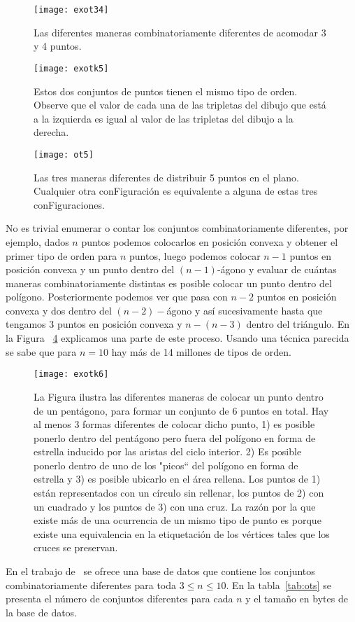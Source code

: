 \begin{figure}[htpb]
  \centering
  \texttt{[image: exot34]}
  \caption{Las diferentes maneras combinatoriamente diferentes
  de acomodar 3 y 4 puntos.}
  \label{fig:exotk34}
\end{figure}
\begin{figure}[htpb]
  \centering
  \texttt{[image: exotk5]}
  \caption{Estos dos conjuntos de puntos tienen el mismo tipo de orden.
  Observe que el valor de cada una de las tripletas del dibujo
  que está a la izquierda es igual al valor de las tripletas del
  dibujo a la derecha.}
  \label{fig:exotk5}
\end{figure}
\begin{figure}[htpb]
  \centering
  \texttt{[image: ot5]}
  \caption{Las tres maneras diferentes de distribuir 5 puntos en el plano.
  Cualquier otra conFiguración es equivalente a alguna de estas tres
  conFiguraciones.}
  \label{fig:ot5}
\end{figure}

No es trivial enumerar o contar los conjuntos combinatoriamente diferentes, por
ejemplo, dados $n$ puntos podemos colocarlos en posición convexa y obtener el
primer tipo de orden para $n$ puntos, luego podemos colocar $n-1$ puntos en
posición convexa y un punto dentro del $(n-1)$-ágono y evaluar de cuántas
maneras combinatoriamente distintas es posible colocar un punto dentro del
polígono. Posteriormente podemos ver que pasa con $n-2$ puntos en posición
convexa y dos dentro del $(n-2)-$ágono y así sucesivamente hasta que tengamos 3
puntos en posición convexa y $n-(n-3)$ dentro del triángulo. En la Figura
~\ref{fig:exotk6} explicamos una parte de este proceso. Usando una técnica
parecida se sabe que para $n=10$ hay más de 14 millones de tipos de orden.
\begin{figure}[htpb]
  \centering
  \texttt{[image: exotk6]}
  \caption{La Figura ilustra las diferentes maneras de colocar un punto
  dentro de un pentágono, para formar un conjunto de 6 puntos en total.
  Hay al menos 3 formas diferentes de colocar dicho punto, 1) es posible
  ponerlo dentro del pentágono pero fuera del polígono en forma de estrella
  inducido por las aristas del ciclo interior. 2) Es posible ponerlo
  dentro de uno de los "picos`` del polígono en forma de estrella y 3)
  es posible ubicarlo en el área rellena. Los puntos de 1) están
  representados con un círculo sin rellenar, los puntos de 2) con un cuadrado
  y los puntos de 3) con una cruz. La razón por la que existe más de una
  ocurrencia de un mismo tipo de punto es porque existe una equivalencia en la
  etiquetación de los vértices tales que los cruces se preservan.}
  \label{fig:exotk6}
\end{figure}
En el trabajo de~\cite{Aichholzer2002} se ofrece una base de datos que contiene
los conjuntos combinatoriamente diferentes para toda $3\leq n\leq 10$. En la
tabla~\ref{tab:ots} se presenta el número de conjuntos diferentes para cada $n$
y el tamaño en bytes de la base de datos.

